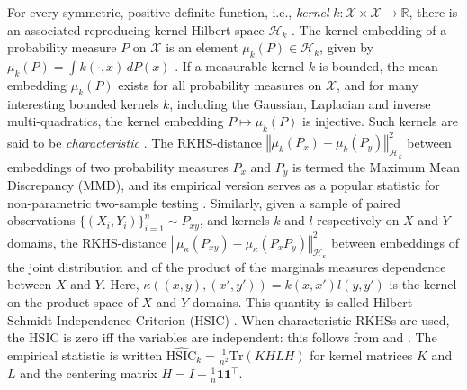 \documentclass{article} %
\begin{document}
For every symmetric, positive definite function, i.e., \emph{kernel} $k:\mathcal{X}\times\mathcal{X}\to\mathbb{R}$,
there is an associated reproducing kernel Hilbert space $\mathcal{H}_{k}$ \cite[p. 19]{BerTho04}.  The kernel embedding of a probability measure
$P$ on $\mathcal{X}$ is an element $\mu_{k}(P)\in\mathcal{H}_{k}$,
given by $\mu_{k}(P)=\int k(\cdot,x)\, dP(x)$ \cite{BerTho04,SmoGreSonSch07}.
If a measurable kernel $k$ is bounded, the mean embedding $\mu_{k}(P)$
exists for all probability measures on $\mathcal{X}$, and for many interesting
bounded kernels $k$, including the Gaussian, Laplacian and inverse
multi-quadratics, the kernel embedding $P\mapsto\mu_{k}(P)$ is injective.
Such kernels are said to be \emph{characteristic} \cite{SriGreFukLanetal10}.
The RKHS-distance $\left\Vert \mu_k(P_x)-\mu_k(P_y)\right\Vert_{{\mathcal H}_k}^2$ between embeddings of two probability measures $P_x$ and $P_y$
is termed the Maximum Mean Discrepancy (MMD), and its empirical version serves as a popular statistic for non-parametric two-sample testing \cite{gretton2012kernel}.
Similarly, given a sample of paired observations $\{(X_i,Y_i)\}_{i=1}^n\sim P_{xy}$, and kernels $k$ and $l$ respectively on $X$ and $Y$ domains, the RKHS-distance 
$\left\Vert \mu_\kappa(P_{xy})-\mu_\kappa(P_x P_y)\right\Vert_{{\mathcal H}_{\kappa}}^2$ between embeddings of the joint distribution and of the product of the marginals measures dependence between $X$ and $Y$. Here, $\kappa((x,y),(x',y'))=k(x,x')l(y,y')$ is the kernel on the product space of $X$ and $Y$ domains.
This quantity is called Hilbert-Schmidt Independence Criterion (HSIC) \cite{gretton_measuring_2005,gretton_kernel_2008}. When characteristic RKHSs are used, the HSIC is zero iff the variables are independent: this follows from 
\cite[Lemma 3.8]{Lyons13} and \cite[Proposition 2]{SriFukLan11}.
The  empirical statistic is written $\widehat{\text{HSIC}}_k = \frac{1}{n^2}\text{Tr}(KHLH)$ for kernel matrices $K$ and $L$ and the centering matrix $H=I-\frac{1}{n}\mathbf{1}\mathbf{1}^\top$.


\vspace{-2mm}
\end{document}
